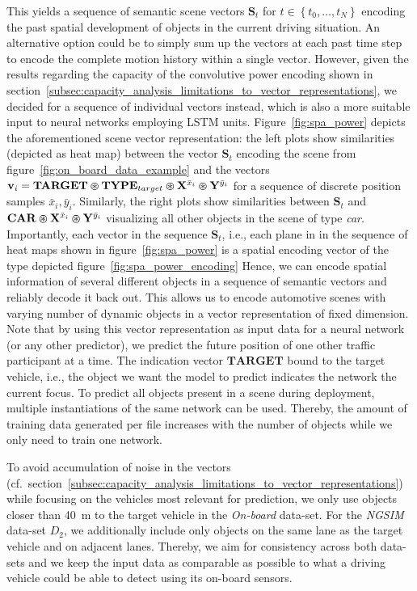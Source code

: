 This yields a sequence of semantic scene vectors $\mathbf{S}_{t}$ for $t \in \left\{t_{0}, \ldots, t_{N} \right\}$ encoding the past spatial development of objects in the current driving situation.
An alternative option could be to simply sum up the vectors at each past time step to encode the complete motion history within a single vector.
However, given the results regarding the capacity of the convolutive power encoding shown in section~\ref{subsec:capacity_analysis_limitations_to_vector_representations}, we decided for a sequence of individual vectors instead, which is also a more suitable input to neural networks employing \ac{LSTM} units.
Figure~\ref{fig:spa_power} depicts the aforementioned scene vector representation: the left plots show similarities (depicted as heat map) between the vector $\mathbf{S}_{t}$ encoding the scene from figure~\ref{fig:on_board_data_example} and the vectors $ \mathbf{v}_{i}=\mathbf{TARGET}\varoast \mathbf{TYPE}_{target} \varoast \mathbf{X}^{\bar{x}_{i}} \varoast \mathbf{Y}^{\bar{y}_{i}}$ for a sequence of discrete position samples ${\bar{x}_{i}, \bar{y}_{i}}$.
Similarly, the right plots show similarities between $\mathbf{S}_{t}$ and $\mathbf{CAR} \varoast \mathbf{X}^{\bar{x}_{i}} \varoast \mathbf{Y}^{\bar{y}_{i}}$ visualizing all other objects in the scene of type \emph{car}.
Importantly, each vector in the sequence $ \mathbf{S}_{t}$, i.e., each plane in in the sequence of heat maps shown in figure~\ref{fig:spa_power} is a spatial encoding vector of the type depicted figure~\ref{fig:spa_power_encoding}
Hence, we can encode spatial information of several different objects in a sequence of semantic vectors and reliably decode it back out.
This allows us to encode automotive scenes with varying number of dynamic objects in a vector representation of fixed dimension.
Note that by using this vector representation as input data for a neural network (or any other predictor), we predict the future position of one other traffic participant at a time.
The indication vector $\mathbf{TARGET}$ bound to the target vehicle, i.e., the object we want the model to predict indicates the network the current focus.
To predict all objects present in a scene during deployment, multiple instantiations of the same network can be used.
Thereby, the amount of training data generated per file increases with the number of objects while we only need to train one network.

To avoid accumulation of noise in the vectors (cf.\ section~\ref{subsec:capacity_analysis_limitations_to_vector_representations}) while focusing on the vehicles most relevant for prediction, we only use objects closer than \SI{40}{\meter} to the target vehicle in the \emph{On-board} data-set.
For the \emph{\ac{NGSIM}} data-set $D_2$, we additionally include only objects on the same lane as the target vehicle and on adjacent lanes.
Thereby, we aim for consistency across both data-sets and we keep the input data as comparable as possible to what a driving vehicle could be able to detect using its on-board sensors.

